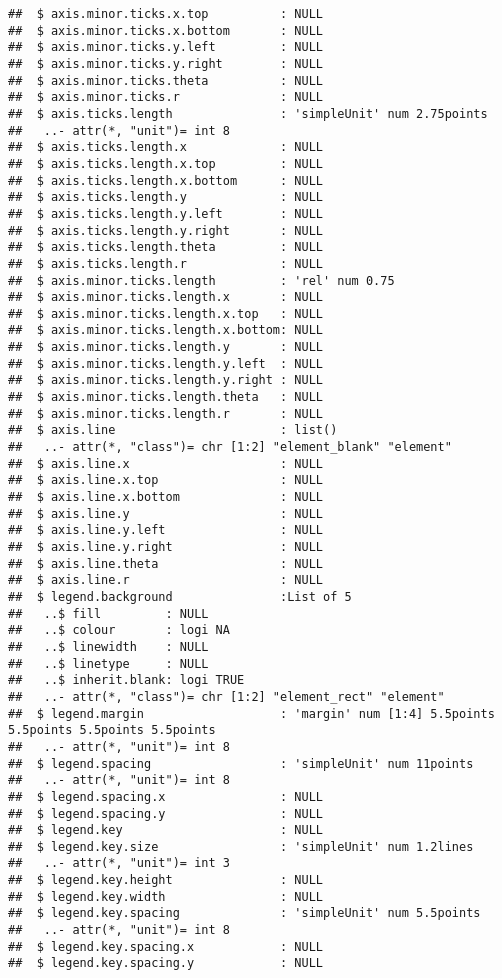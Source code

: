 \documentclass[
]{article}
\begin{document}
\begin{verbatim}
##  $ axis.minor.ticks.x.top          : NULL
##  $ axis.minor.ticks.x.bottom       : NULL
##  $ axis.minor.ticks.y.left         : NULL
##  $ axis.minor.ticks.y.right        : NULL
##  $ axis.minor.ticks.theta          : NULL
##  $ axis.minor.ticks.r              : NULL
##  $ axis.ticks.length               : 'simpleUnit' num 2.75points
##   ..- attr(*, "unit")= int 8
##  $ axis.ticks.length.x             : NULL
##  $ axis.ticks.length.x.top         : NULL
##  $ axis.ticks.length.x.bottom      : NULL
##  $ axis.ticks.length.y             : NULL
##  $ axis.ticks.length.y.left        : NULL
##  $ axis.ticks.length.y.right       : NULL
##  $ axis.ticks.length.theta         : NULL
##  $ axis.ticks.length.r             : NULL
##  $ axis.minor.ticks.length         : 'rel' num 0.75
##  $ axis.minor.ticks.length.x       : NULL
##  $ axis.minor.ticks.length.x.top   : NULL
##  $ axis.minor.ticks.length.x.bottom: NULL
##  $ axis.minor.ticks.length.y       : NULL
##  $ axis.minor.ticks.length.y.left  : NULL
##  $ axis.minor.ticks.length.y.right : NULL
##  $ axis.minor.ticks.length.theta   : NULL
##  $ axis.minor.ticks.length.r       : NULL
##  $ axis.line                       : list()
##   ..- attr(*, "class")= chr [1:2] "element_blank" "element"
##  $ axis.line.x                     : NULL
##  $ axis.line.x.top                 : NULL
##  $ axis.line.x.bottom              : NULL
##  $ axis.line.y                     : NULL
##  $ axis.line.y.left                : NULL
##  $ axis.line.y.right               : NULL
##  $ axis.line.theta                 : NULL
##  $ axis.line.r                     : NULL
##  $ legend.background               :List of 5
##   ..$ fill         : NULL
##   ..$ colour       : logi NA
##   ..$ linewidth    : NULL
##   ..$ linetype     : NULL
##   ..$ inherit.blank: logi TRUE
##   ..- attr(*, "class")= chr [1:2] "element_rect" "element"
##  $ legend.margin                   : 'margin' num [1:4] 5.5points 5.5points 5.5points 5.5points
##   ..- attr(*, "unit")= int 8
##  $ legend.spacing                  : 'simpleUnit' num 11points
##   ..- attr(*, "unit")= int 8
##  $ legend.spacing.x                : NULL
##  $ legend.spacing.y                : NULL
##  $ legend.key                      : NULL
##  $ legend.key.size                 : 'simpleUnit' num 1.2lines
##   ..- attr(*, "unit")= int 3
##  $ legend.key.height               : NULL
##  $ legend.key.width                : NULL
##  $ legend.key.spacing              : 'simpleUnit' num 5.5points
##   ..- attr(*, "unit")= int 8
##  $ legend.key.spacing.x            : NULL
##  $ legend.key.spacing.y            : NULL

\end{verbatim}
\end{document}
